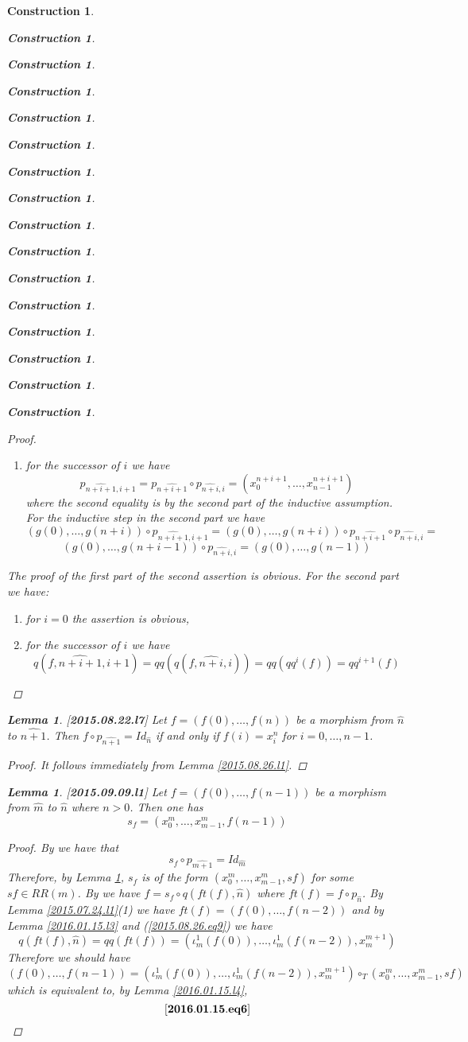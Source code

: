 \documentclass[12pt]{amsart}
\newenvironment{eq}{\begin{equation}}{\end{equation}}
\newtheorem{lemma}[proposition]{Lemma}
\newtheorem{construction}[proposition]{Construction}
\newcommand{\llabel}[1]{\label{#1}[{\bf #1}]}
\newcommand{\wh}{\widehat}
\newcommand{\hc}{\circ_{T}}
\begin{document}
\begin{construction}
\begin{construction}
\begin{construction}
\begin{construction}
\begin{construction}
\begin{construction}
\begin{construction}
\begin{construction}
\begin{construction}
\begin{construction}
\begin{construction}
\begin{construction}
\begin{construction}
\begin{construction}
\begin{construction}
\begin{construction}
\begin{proof}
\begin{enumerate}
\item for the successor of $i$ we have
%
$$p_{\wh{n+i+1},i+1}=p_{\wh{n+i+1}}\circ p_{\wh{n+i},i}=(x_0^{n+i+1},\dots,x_{n-1}^{n+i+1})$$
%
where the second equality is by the second part of the inductive assumption. For the inductive step in the second part we have
%
$$(g(0),\dots,g(n+i))\circ p_{\wh{n+i+1},i+1}=(g(0),\dots,g(n+i))\circ p_{\wh{n+i+1}}\circ p_{\wh{n+i},i}=$$$$
(g(0),\dots,g(n+i-1))\circ p_{\wh{n+i},i}=(g(0),\dots,g(n-1))$$
%
\end{enumerate}
%
The proof of the first part of the second assertion is obvious. For the second part we have:
%
\begin{enumerate}
\item for $i=0$ the assertion is obvious,
\item for the successor of $i$ we have 
%
$$q(f,\wh{n+i+1},i+1)=qq(q(f,\wh{n+i},i))=qq(qq^i(f))=qq^{i+1}(f)$$
%
\end{enumerate}
%
\end{proof}
%
\begin{lemma}
\llabel{2015.08.22.l7}
Let $f=(f(0),\dots,f(n))$ be a morphism from $\wh{n}$ to $\wh{n+1}$. Then $f\circ p_{\wh{n+1}}=Id_{\wh{n}}$ if and only if $f(i)=x_i^{n}$ for $i=0,\dots,n-1$.
\end{lemma}
%
\begin{proof}
It follows immediately from Lemma \ref{2015.08.26.l1}.
\end{proof}
%
\begin{lemma}
\llabel{2015.09.09.l1}
Let $f=(f(0),\dots,f(n-1))$ be a morphism from $\wh{m}$ to $\wh{n}$ where $n>0$. Then one has
%
$$s_f=(x_0^{m},\dots,x_{m-1}^{m},f(n-1))$$
%
\end{lemma}
%
\begin{proof}
By \cite[Definition 2.3(2)]{Csubsystems} we have that 
%
$$s_f\circ p_{\wh{m+1}}=Id_{\wh{m}}$$
%
Therefore, by Lemma \ref{2015.08.22.l7}, $s_f$ is of the form $(x_0^m,\dots,x_{m-1}^m,sf)$ for some $sf\in RR(m)$. By \cite[Definition 2.3(3)]{Csubsystems} we have $f=s_f\circ q(ft(f),\wh{n})$ where $ft(f)=f\circ p_{\wh{n}}$. By Lemma \ref{2015.07.24.l1}(1) we have $ft(f)=(f(0),\dots,f(n-2))$ and by  Lemma \ref{2016.01.15.l3} and (\ref{2015.08.26.eq9}) we have
%
$$q(ft(f),\wh{n})=qq(ft(f))=(\iota_m^1(f(0)),\dots,\iota_m^1(f(n-2)),x_{m}^{m+1})$$
%
Therefore we should have
%
$$(f(0),\dots,f(n-1))=(\iota_m^1(f(0)),\dots,\iota_m^1(f(n-2)),x_{m}^{m+1})\hc (x_0^m,\dots,x_{m-1}^m,sf)$$
%
which is equivalent to, by Lemma \ref{2016.01.15.l4}, 
%
\begin{eq}\llabel{2016.01.15.eq6}

\end{eq}
\end{proof}
\end{construction}
\end{construction}
\end{construction}
\end{construction}
\end{construction}
\end{construction}
\end{construction}
\end{construction}
\end{construction}
\end{construction}
\end{construction}
\end{construction}
\end{construction}
\end{construction}
\end{construction}
\end{construction}
\end{document}
